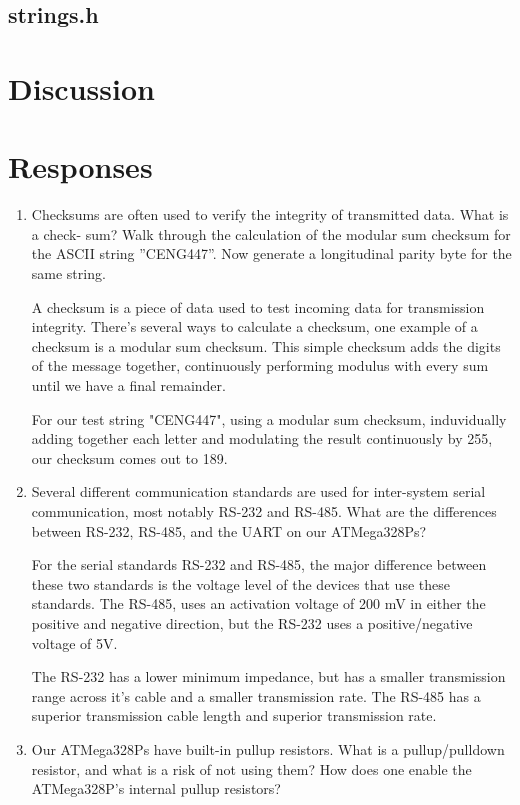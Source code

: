 \documentclass[letterpaper,11pt]{texMemo} %
\begin{document}
\subsection*{strings.h}

\section*{Discussion}


\newpage
\section*{Responses}
\begin{enumerate}
    \item Checksums are often used to verify the integrity of transmitted data. What is a check-
sum? Walk through the calculation of the modular sum checksum for the ASCII string
”CENG447”. Now generate a longitudinal parity byte for the same string.
 
    A checksum is a piece of data used to test incoming data for transmission 
integrity. There's several ways to calculate a checksum, one example of a checksum is a 
modular sum checksum. This simple checksum adds the digits of the message together, continuously
performing modulus with every sum until we have a final remainder.

    For our test string "CENG447", using a modular sum checksum, induvidually
adding together each letter and modulating the result continuously by 255, our checksum comes out
to 189.

    \item Several different communication standards are used for inter-system serial communication,
most notably RS-232 and RS-485. What are the differences between RS-232, RS-485, and the
UART on our ATMega328Ps?

    For the serial standards RS-232 and RS-485, the major difference between these two standards is
the voltage level of the devices that use these standards. The RS-485, uses an activation voltage of
200 mV in either the positive and negative direction, but the RS-232 uses a positive/negative voltage
of 5V.

    The RS-232 has a lower minimum impedance, but has a smaller transmission range across it's cable
and a smaller transmission rate. The RS-485 has a superior transmission cable length and superior
transmission rate.

    \item Our ATMega328Ps have built-in pullup resistors. What is a pullup/pulldown resistor, and
what is a risk of not using them? How does one enable the ATMega328P’s internal pullup
resistors?


\end{enumerate}
\end{document}
